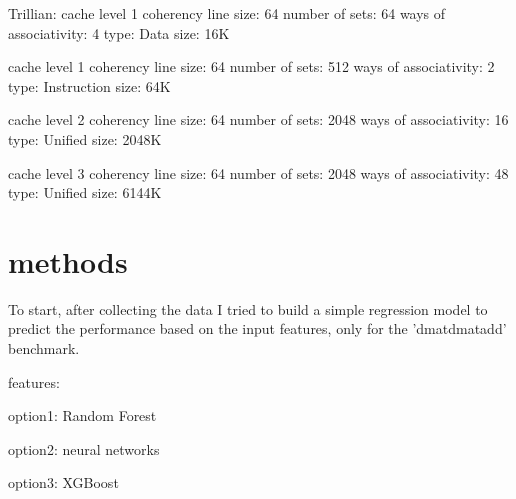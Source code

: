 Trillian:
cache level 1
coherency line size: 64
number of sets: 64
ways of associativity: 4
type: Data
size: 16K

cache level 1
coherency line size: 64
number of sets: 512
ways of associativity: 2
type: Instruction
size: 64K

cache level 2
coherency line size: 64
number of sets: 2048
ways of associativity: 16
type: Unified
size: 2048K

cache level 3
coherency line size: 64
number of sets: 2048
ways of associativity: 48
type: Unified
size: 6144K
\section{methods}













To start, after collecting the data I tried to build a simple regression model to predict the performance based on the input features, only for the 'dmatdmatadd' benchmark. 

features:

option1: Random Forest

option2: neural networks

option3: XGBoost